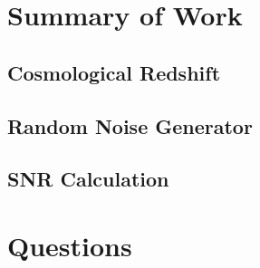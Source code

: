 \documentclass{article}
\begin{document}
\begin{multicols*}{2}
\section{Summary of Work}

\subsection{Cosmological Redshift}

\subsection{Random Noise Generator}

\subsection{SNR Calculation}

\section{Questions}








\end{multicols*}
\end{document}
